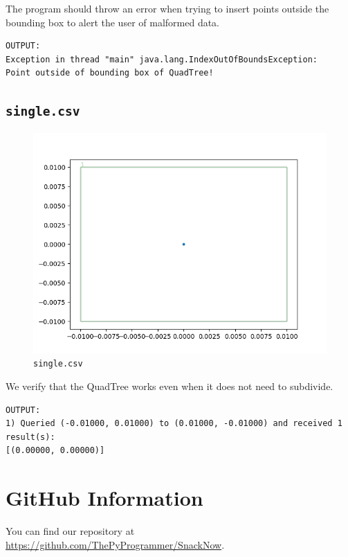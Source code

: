 \documentclass[12pt]{article}
\begin{document}
{The program should throw an error when trying to insert points outside the bounding box to alert the user of malformed data.

\begin{verbatim}
OUTPUT:
Exception in thread "main" java.lang.IndexOutOfBoundsException:
Point outside of bounding box of QuadTree!
\end{verbatim}

\subsection{\texttt{single.csv}}
\begin{figure}
    \centering
    \includegraphics[scale=0.8]{../img/single.png}
    \caption{\texttt{single.csv}}
    \label{fig:my_label}
\end{figure}

We verify that the QuadTree works even when it does not need to subdivide.

\begin{verbatim}
OUTPUT:
1) Queried (-0.01000, 0.01000) to (0.01000, -0.01000) and received 1 result(s):
[(0.00000, 0.00000)]
\end{verbatim}



\newpage
\section{GitHub Information}
You can find our repository at \url{https://github.com/ThePyProgrammer/SnackNow}.

}
\end{document}
